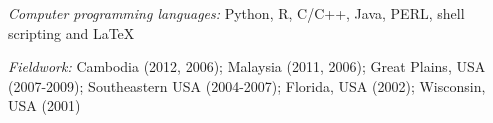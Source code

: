 \myHangIndent
{\sffamily\itshape Computer programming languages:} Python, R, C/C++, Java,
PERL, shell scripting and \LaTeX

\myHangIndent
{\sffamily\itshape Fieldwork:} Cambodia (2012, 2006); Malaysia (2011, 2006);
Great Plains, USA (2007-2009); Southeastern USA (2004-2007); Florida, USA
(2002); Wisconsin, USA (2001)


